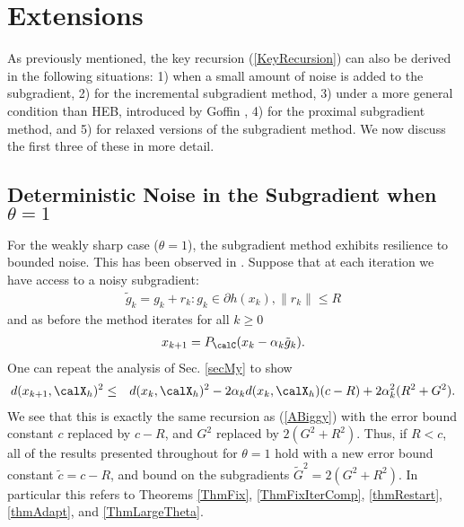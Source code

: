 \section{Extensions}\label{secExtend}
As previously mentioned, the key recursion (\ref{KeyRecursion}) can also be derived in the following situations: 1) when a small amount of noise is added to the subgradient, 2) for the incremental subgradient method, 3) under a more general condition than HEB, introduced by Goffin \cite{goffin1977convergence},  4) for the proximal subgradient method, and 5) for relaxed versions of the subgradient method. We now discuss the first three of these in more detail. 

\subsection{Deterministic Noise in the Subgradient when $\theta=1$}
    For the weakly sharp case ($\theta=1$), the subgradient method exhibits resilience to bounded noise. This has been observed in \cite{nedic2010effect,poljak1978nonlinear}. Suppose that at each iteration we have access to a noisy subgradient:
    \begin{eqnarray*}
    \tilde{g}_k = g_k+r_k:g_k\in\partial h(x_k),\|r_k\|\leq R
    \end{eqnarray*}
    and as before the method iterates for all $k\geq 0$
    \begin{eqnarray*}
     x_{k+1}=P_{\calC}(x_k - \alpha_k\tilde{g}_k).
    \end{eqnarray*}
One can repeat the analysis of Sec. \ref{secMy} to show
     \begin{eqnarray*}
     d(x_{k+1},\calX_h)^2
     &\leq&
     d(x_k,\calX_h)^2
     -2\alpha_k  d(x_k,\calX_h)(c-R)
     +2\alpha_k^2 (R^2+G^2).
     \end{eqnarray*}
     We see that this is exactly the same recursion as (\ref{ABiggy}) with the error bound constant $c$ replaced by $c-R$, and $G^2$ replaced by $2(G^2+R^2)$. Thus, if $R<c$, all of the results presented throughout for $\theta=1$ hold with a new error bound constant $\tilde{c}=c-R$, and bound on the subgradients $\tilde{G}^2 = 2(G^2+R^2)$. In particular this refers to Theorems \ref{ThmFix}, \ref{ThmFixIterComp}, \ref{thmRestart}, \ref{thmAdapt}, and \ref{ThmLargeTheta}.
 

